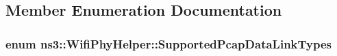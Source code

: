 \subsection{Member Enumeration Documentation}
\subsubsection[{\texorpdfstring{Supported\+Pcap\+Data\+Link\+Types}{SupportedPcapDataLinkTypes}}]{\setlength{\rightskip}{0pt plus 5cm}enum {\bf ns3\+::\+Wifi\+Phy\+Helper\+::\+Supported\+Pcap\+Data\+Link\+Types}}\hypertarget{classns3_1_1WifiPhyHelper_ab5b7fd179ec894742ac15f6751d68fc1}{}\label{classns3_1_1WifiPhyHelper_ab5b7fd179ec894742ac15f6751d68fc1}
